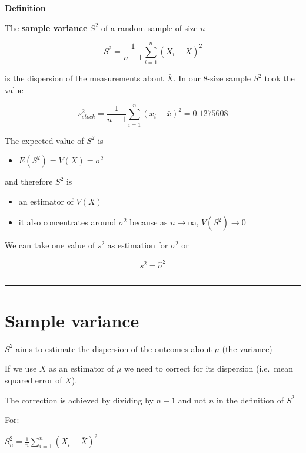 \documentclass[
]{book}
\providecommand{\tightlist}{%
  \setlength{\itemsep}{0pt}\setlength{\parskip}{0pt}}
\begin{document}
\textbf{Definition}

The \textbf{sample variance} \(S^2\) of a random sample of size \(n\)

\[S^2= \frac{1}{n-1}\sum_{i=1}^n (X_i-\bar{X})^2\]

is the dispersion of the measurements about \(\bar{X}\). In our \(8\)-size sample \(S^2\) took the value

\[s_{stock}^2=\frac{1}{n-1}\sum_{i=1}^n (x_i-\bar{x})^2=0.1275608\]

The expected value of \(S^2\) is

\begin{itemize}
\tightlist
\item
  \(E(S^2)=V(X)=\sigma^2\)
\end{itemize}

and therefore \(S^2\) is

\begin{itemize}
\tightlist
\item
  an estimator of \(V(X)\)
\item
  it also concentrates around \(\sigma^2\) because as \(n \rightarrow \infty\), \(V(\bar{S^2}) \rightarrow 0\)
\end{itemize}

We can take one value of \(s^2\) as estimation for \(\sigma^2\) or

\[s^2=\hat{\sigma}^2\]

\begin{center}\rule{0.5\linewidth}{0.5pt}\end{center}

\begin{center}\rule{0.5\linewidth}{0.5pt}\end{center}

\hypertarget{sample-variance-3}{%
\section{Sample variance}\label{sample-variance-3}}

\(S^2\) aims to estimate the dispersion of the outcomes about \(\mu\) (the variance)

If we use \(\bar{X}\) as an estimator of \(\mu\) we need to correct for its dispersion (i.e.~mean squared error of \(\bar{X}\)).

The correction is achieved by dividing by \(n-1\) and not \(n\) in the definition of \(S^2\)

For:

\(S_n^2=\frac{1}{n}\sum_{i=1}^n (X_i-\bar{X})^2\)
\end{document}
